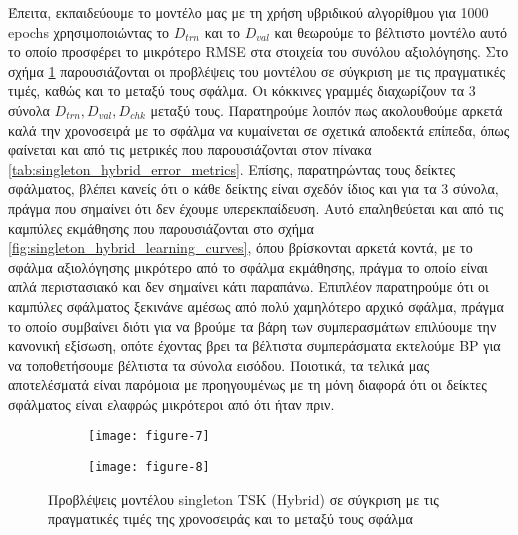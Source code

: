 \documentclass[11pt,a4paper,titlepage, oneside]{article}
\newlength\figureheight
\newlength\figurewidth
\begin{document}
			 Έπειτα, εκπαιδεύουμε το μοντέλο μας με τη χρήση υβριδικού αλγορίθμου για 1000 epochs χρησιμοποιώντας το $D_{trn}$ και το $D_{val}$ και θεωρούμε το βέλτιστο μοντέλο αυτό το οποίο προσφέρει το μικρότερο RMSE στα στοιχεία του συνόλου αξιολόγησης. Στο σχήμα \ref{fig:singleton_hybrid_predictions} παρουσιάζονται οι προβλέψεις του μοντέλου σε σύγκριση με τις πραγματικές τιμές, καθώς και το μεταξύ τους σφάλμα. Οι κόκκινες γραμμές διαχωρίζουν τα 3 σύνολα $D_{trn}, D_{val}, D_{chk}$ μεταξύ τους. Παρατηρούμε λοιπόν πως ακολουθούμε αρκετά καλά την χρονοσειρά με το σφάλμα να κυμαίνεται σε σχετικά αποδεκτά επίπεδα, όπως φαίνεται και από τις μετρικές που παρουσιάζονται στον πίνακα \ref{tab:singleton_hybrid_error_metrics}. Επίσης, παρατηρώντας τους δείκτες σφάλματος, βλέπει κανείς ότι ο κάθε δείκτης είναι σχεδόν ίδιος και για τα 3 σύνολα, πράγμα που σημαίνει ότι δεν έχουμε υπερεκπαίδευση. Αυτό επαληθεύεται και από τις καμπύλες εκμάθησης που παρουσιάζονται στο σχήμα \ref{fig:singleton_hybrid_learning_curves}, όπου βρίσκονται αρκετά κοντά, με το σφάλμα αξιολόγησης μικρότερο από το σφάλμα εκμάθησης, πράγμα το οποίο είναι απλά περιστασιακό και δεν σημαίνει κάτι παραπάνω. Επιπλέον παρατηρούμε ότι οι καμπύλες σφάλματος ξεκινάνε αμέσως από πολύ χαμηλότερο αρχικό σφάλμα, πράγμα το οποίο συμβαίνει διότι για να βρούμε τα βάρη των συμπερασμάτων επιλύουμε την κανονική εξίσωση, οπότε έχοντας βρει τα βέλτιστα συμπεράσματα εκτελούμε BP για να τοποθετήσουμε βέλτιστα τα σύνολα εισόδου. Ποιοτικά, τα τελικά μας αποτελέσματά είναι παρόμοια με προηγουμένως με τη μόνη διαφορά ότι οι δείκτες σφάλματος είναι ελαφρώς μικρότεροι από ότι ήταν πριν.\\
						
			\begin{figure}
			 	\setlength{}
				\setlength{}	
				\centering
				\begin{subfigure}[b]{0.49\textwidth}
					\texttt{[image: figure-7]}
				\end{subfigure}
				\begin{subfigure}[b]{0.49\textwidth}
					\texttt{[image: figure-8]}
				\end{subfigure}
				\caption{Προβλέψεις μοντέλου singleton TSK (Hybrid) σε σύγκριση με τις πραγματικές τιμές της χρονοσειράς και το μεταξύ τους σφάλμα}
				\label{fig:singleton_hybrid_predictions}
			\end{figure}
			
\end{document}
